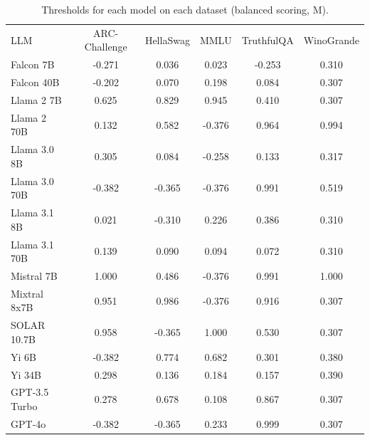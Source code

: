 \begin{table}[h]
\caption{Thresholds for each model on each dataset (balanced scoring, M). }
\label{tab:thresholds_prob_entropy_k20_w1}
\centering
\begin{tabular}{l S[table-format=3.1] S[table-format=3.1] S[table-format=3.1] S[table-format=3.1] S[table-format=3.1]}
\toprule
LLM & ARC-Challenge & HellaSwag & MMLU & TruthfulQA & WinoGrande \\ 
\cmidrule(lr){1-1} \cmidrule(lr){2-2} \cmidrule(lr){3-3} \cmidrule(lr){4-4} \cmidrule(lr){5-5} \cmidrule(lr){6-6}
Falcon 7B & -0.271 & 0.036 & 0.023 & -0.253 & 0.310\\
Falcon 40B & -0.202 & 0.070 & 0.198 & 0.084 & 0.307\\
Llama 2 7B & 0.625 & 0.829 & 0.945 & 0.410 & 0.307\\
Llama 2 70B & 0.132 & 0.582 & -0.376 & 0.964 & 0.994\\
Llama 3.0 8B & 0.305 & 0.084 & -0.258 & 0.133 & 0.317\\
Llama 3.0 70B & -0.382 & -0.365 & -0.376 & 0.991 & 0.519\\
Llama 3.1 8B & 0.021 & -0.310 & 0.226 & 0.386 & 0.310\\
Llama 3.1 70B & 0.139 & 0.090 & 0.094 & 0.072 & 0.310\\
Mistral 7B & 1.000 & 0.486 & -0.376 & 0.991 & 1.000\\
Mixtral 8x7B & 0.951 & 0.986 & -0.376 & 0.916 & 0.307\\
SOLAR 10.7B & 0.958 & -0.365 & 1.000 & 0.530 & 0.307\\
Yi 6B & -0.382 & 0.774 & 0.682 & 0.301 & 0.380\\
Yi 34B & 0.298 & 0.136 & 0.184 & 0.157 & 0.390\\
GPT-3.5 Turbo & 0.278 & 0.678 & 0.108 & 0.867 & 0.307\\
GPT-4o & -0.382 & -0.365 & 0.233 & 0.999 & 0.307\\
\bottomrule
\end{tabular}
\end{table}
